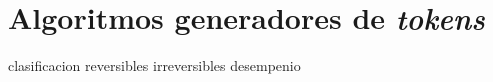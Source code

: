 %
%
%

\section{Algoritmos generadores de \textit{tokens}}

{clasificacion}
{reversibles}
{irreversibles}
{desempenio}
